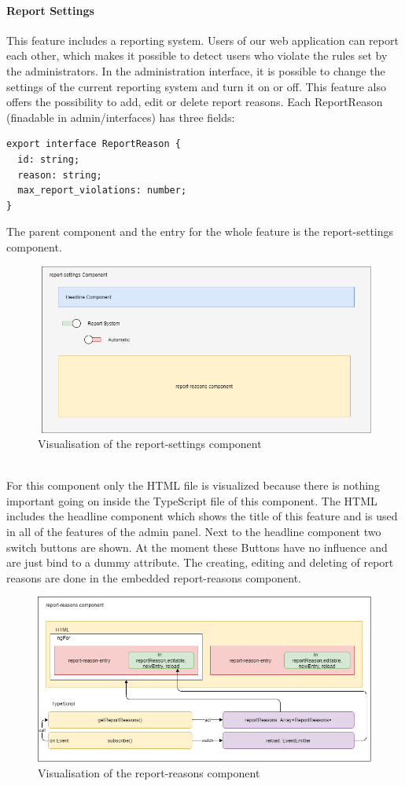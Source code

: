 \paragraph{Report Settings}
This feature includes a reporting system. Users of our web application can report each other, which makes it possible to detect users who violate the rules set by the administrators. In the administration interface, it is possible to change the settings of the current reporting system and turn it on or off. This feature also offers the possibility to add, edit or delete report reasons. Each ReportReason (finadable in admin/interfaces) has three fields:
\begin{verbatim}
export interface ReportReason {
  id: string;
  reason: string;
  max_report_violations: number;
}
\end{verbatim}
The parent component and the entry for the whole feature is the report-settings component.
\begin{figure}[h]
    \centering
    \includegraphics[width=1.0\textwidth]{./images/report_settings_1}
    \caption{Visualisation of the report-settings component}
    \label{fig:reportset}
\end{figure}
\\
For this component only the HTML file is visualized because there is nothing important going on inside the TypeScript file of this component. The HTML includes the headline component which shows the title of this feature and is used in all of the features of the admin panel. Next to the headline component two switch buttons are shown. At the moment these Buttons have no influence and are just bind to a dummy attribute. The creating, editing and deleting of report reasons are done in the embedded report-reasons component.
\begin{figure}[h]
    \centering
    \includegraphics[width=1.0\textwidth]{./images/report_reasons_2}
    \caption{Visualisation of the report-reasons component}
    \label{fig:reportreason}
\end{figure}
